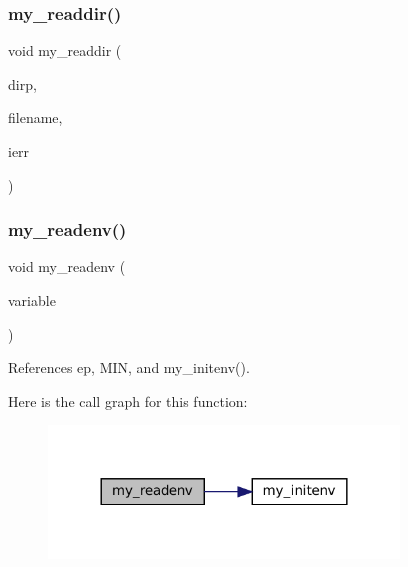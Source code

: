 \subsubsection{\texorpdfstring{my\+\_\+readdir()}{my\_readdir()}}
{\footnotesize\ttfamily void my\+\_\+readdir (\begin{DoxyParamCaption}\item[{D\+IR $\ast$}]{dirp,  }\item[{char $\ast$}]{filename,  }\item[{int $\ast$}]{ierr }\end{DoxyParamCaption})}

\mbox{\label{C-M__system_8c_a0114eece06797ba0c5e6f5948841501a}} 
\subsubsection{\texorpdfstring{my\+\_\+readenv()}{my\_readenv()}}
{\footnotesize\ttfamily void my\+\_\+readenv (\begin{DoxyParamCaption}\item[{char $\ast$}]{variable }\end{DoxyParamCaption})}



References ep, M\+IN, and my\+\_\+initenv().

Here is the call graph for this function\+:
\nopagebreak
\begin{figure}[H]
\begin{center}
\leavevmode
\includegraphics[width=264pt]{C-M__system_8c_a0114eece06797ba0c5e6f5948841501a_cgraph}
\end{center}
\end{figure}
\mbox{\label{C-M__system_8c_a3cdda415df9f1522e545474e11c78a5c}} 
